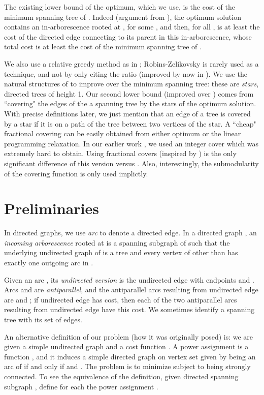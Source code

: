\documentclass[12pt]{article}
\begin{document}
The existing lower bound of the optimum, which we use,
is the cost of the minimum spanning tree of . Indeed 
(argument from \cite{CH89}), 
the optimum solution  contains an 
in-arborescence rooted at , for some , and then, 
for all ,  is at least
the cost of the directed edge connecting 
 to its parent in this in-arborescence, whose total cost 
is at least the cost of the minimum spanning tree of .

We also use a relative greedy method as in \cite{Z96,RZ00};
Robins-Zelikovsky \cite{RZ00} is rarely used as a technique, 
and not by only citing the ratio (improved by now in \cite{BGRS10}).
We use the natural structures  of \cite{CFM07} to improve over the
minimum spanning tree: these are {\em stars}, directed trees of height 1. 
Our second lower bound (improved over \cite{C10})
comes from ``covering"
the edges of the a spanning tree by the stars of the optimum solution.
With precise definitions later, we just mention that
an edge of a tree is covered by a star if it is on a path of the tree between
two vertices of the star.
A ``cheap" fractional covering can be easily obtained from either optimum
or the linear programming relaxation.
In our earlier work \cite{C10}, we used an integer cover which was
extremely hard to obtain. 
Using fractional covers (inspired by \cite{BGRS10})
is the only significant difference of this version versus \cite{C10}.
Also, interestingly, the 
submodularity of the covering function is only used implictly.

\section{Preliminaries}
\label{s_prel}

In directed graphs, we use {\em arc} to denote a directed edge.
In a directed graph ,
an {\em incoming arborescence}  rooted at  is a 
spanning subgraph  of 
such that the underlying undirected graph of  is a tree 
and every vertex of  other than  has exactly one outgoing arc in . 


Given an arc  , its {\em undirected version} is 
the undirected edge with endpoints  and .
Arcs  and  are {\em antiparallel}, and the antiparallel arcs
resulting from undirected edge  are  and ; if undirected edge
  has cost, then each of the two antiparallel arcs
resulting from undirected edge   have this cost.
We sometimes identify a spanning tree  with its set of edges.

An alternative definition of our problem (how it was originally posed) is:
we are given a simple undirected graph 
and a cost function .
A power assignment is a function , and it
induces a simple directed graph  on vertex set  given by
 being an arc of  if and only if
  and .
The problem is to minimize  subject to 
being strongly connected.
To see the equivalence of the definition, given directed spanning subgraph 
, define for each  the power assignment .
\end{document}
